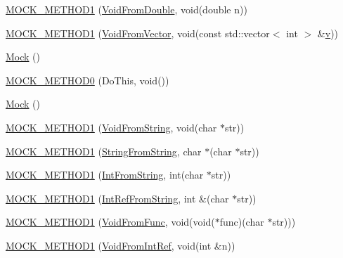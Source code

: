 \begin{DoxyCompactItemize}
\item 
\mbox{\hyperlink{class_mock_a890668928abcd28d4d39df164e7b6dd8}{M\+O\+C\+K\+\_\+\+M\+E\+T\+H\+O\+D1}} (\mbox{\hyperlink{class_interface_aa56524017aabdbe46510648c711ab8a8}{Void\+From\+Double}}, void(double n))
\item 
\mbox{\hyperlink{class_mock_a50e2bda4375a59bb89fd5652bd33eb0f}{M\+O\+C\+K\+\_\+\+M\+E\+T\+H\+O\+D1}} (\mbox{\hyperlink{class_interface_ae84fe7e53f881db2f823ad35d004927a}{Void\+From\+Vector}}, void(const std\+::vector$<$ int $>$ \&\mbox{\hyperlink{_important_values_8h_aaad811047eb9ea3edb6ec2bbeddb2b2b}{v}}))
\item 
\mbox{\hyperlink{class_mock_a2b9528f2e7fcf9738201a5ea667c1998}{Mock}} ()
\item 
\mbox{\hyperlink{class_mock_ae710f23cafb1a2f17772e8805d6312d2}{M\+O\+C\+K\+\_\+\+M\+E\+T\+H\+O\+D0}} (Do\+This, void())
\item 
\mbox{\hyperlink{class_mock_a2b9528f2e7fcf9738201a5ea667c1998}{Mock}} ()
\item 
\mbox{\hyperlink{class_mock_ada59eea6991953353f332e3ea1e74444}{M\+O\+C\+K\+\_\+\+M\+E\+T\+H\+O\+D1}} (\mbox{\hyperlink{class_interface_a65d6ae604e7e9a513aec72c9c94e0b97}{Void\+From\+String}}, void(char $\ast$str))
\item 
\mbox{\hyperlink{class_mock_a2db4d82b6f92b4e462929f651ac4c3b1}{M\+O\+C\+K\+\_\+\+M\+E\+T\+H\+O\+D1}} (\mbox{\hyperlink{class_interface_a756b1d22c12aa3f14a5083f90043fbf0}{String\+From\+String}}, char $\ast$(char $\ast$str))
\item 
\mbox{\hyperlink{class_mock_ae73b4ee90bf6d84205d2b1c17f0b8433}{M\+O\+C\+K\+\_\+\+M\+E\+T\+H\+O\+D1}} (\mbox{\hyperlink{class_interface_ab34c8a5fd2236a6b009f86a4e5851b61}{Int\+From\+String}}, int(char $\ast$str))
\item 
\mbox{\hyperlink{class_mock_a2cece30a3ea92b34f612f8032fe3a0f9}{M\+O\+C\+K\+\_\+\+M\+E\+T\+H\+O\+D1}} (\mbox{\hyperlink{class_interface_ab93276de67e60c44fd775d4c139aa8e1}{Int\+Ref\+From\+String}}, int \&(char $\ast$str))
\item 
\mbox{\hyperlink{class_mock_ac70c052254fa9816bd759c006062dc47}{M\+O\+C\+K\+\_\+\+M\+E\+T\+H\+O\+D1}} (\mbox{\hyperlink{class_interface_a7dab3c82b857a9a5f52b3ce6f7df547f}{Void\+From\+Func}}, void(void($\ast$func)(char $\ast$str)))
\item 
\mbox{\hyperlink{class_mock_ae2379efbc030f1adf8b032be3bdf081d}{M\+O\+C\+K\+\_\+\+M\+E\+T\+H\+O\+D1}} (\mbox{\hyperlink{class_interface_aa43fb56650a57b6b3e7743e54e50cb86}{Void\+From\+Int\+Ref}}, void(int \&n))

\end{DoxyCompactItemize}
